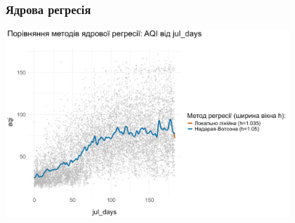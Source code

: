 \documentclass{beamer}
\begin{document}
%  
% 

\begin{frame}
  \frametitle{Ядрова регресія}
  
  \begin{center}
    \includegraphics[height=2.8in]{plots/lab4/kernal/npreg_comparison_final_10.png}
  \end{center}
 
\end{frame}
\end{document}
